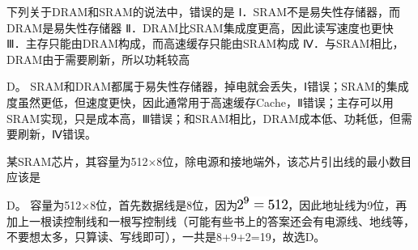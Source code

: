 \question 下列关于DRAM和SRAM的说法中，错误的是
Ⅰ．SRAM不是易失性存储器，而DRAM是易失性存储器
Ⅱ．DRAM比SRAM集成度更高，因此读写速度也更快
Ⅲ．主存只能由DRAM构成，而高速缓存只能由SRAM构成
Ⅳ．与SRAM相比，DRAM由于需要刷新，所以功耗较高
\par{}
\begin{solution}D。
SRAM和DRAM都属于易失性存储器，掉电就会丢失，Ⅰ错误；SRAM的集成度虽然更低，但速度更快，因此通常用于高速缓存Cache，Ⅱ错误；主存可以用SRAM实现，只是成本高，Ⅲ错误；和SRAM相比，DRAM成本低、功耗低，但需要刷新，Ⅳ错误。
\end{solution}
\question 某SRAM芯片，其容量为512×8位，除电源和接地端外，该芯片引出线的最小数目应该是
\par{}
\begin{solution}D。
容量为512×8位，首先数据线是8位，因为\includegraphics[width=0.64583in,height=0.16667in]{texmath/78dfcc5Cdpi7B3507D25E93D512}，因此地址线为9位，再加上一根读控制线和一根写控制线（可能有些书上的答案还会有电源线、地线等，不要想太多，只算读、写线即可），一共是8+9+2=19，故选D。
\end{solution}
